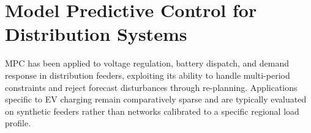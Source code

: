 \section{Model Predictive Control for Distribution Systems}
MPC has been applied to voltage regulation, battery dispatch, and demand response in
distribution feeders, exploiting its ability to handle multi-period constraints and reject
forecast disturbances through re-planning. Applications specific to EV charging remain
comparatively sparse and are typically evaluated on synthetic feeders rather than networks
calibrated to a specific regional load profile.
